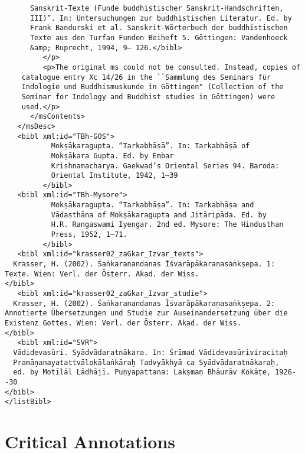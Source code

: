 \documentclass[article,12pt,a4paper]{memoir}
\begin{document}
\begin{verbatim}
      Sanskrit-Texte (Funde buddhistischer Sanskrit-Handschriften,
      III)”. In: Untersuchungen zur buddhistischen Literatur. Ed. by
      Frank Bandurski et al. Sanskrit-Wörterbuch der buddhistischen
      Texte aus den Turfan Funden Beiheft 5. Göttingen: Vandenhoeck
      &amp; Ruprecht, 1994, 9– 126.</bibl>
         </p>
         <p>The original ms could not be consulted. Instead, copies of
    catalogue entry Xc 14/26 in the ``Sammlung des Seminars für
    Indologie und Buddhismuskunde in Göttingen" (Collection of the
    Seminar for Indology and Buddhist studies in Göttingen) were
    used.</p>
      </msContents>
   </msDesc>
   <bibl xml:id="TBh-GOS">
	       Mokṣākaragupta. “Tarkabhāṣā”. In: Tarkabhāṣā of
	       Mokṣākara Gupta. Ed. by Embar
	       Krishnamacharya. Gaekwad’s Oriental Series 94. Baroda:
	       Oriental Institute, 1942, 1–39
	     </bibl>
   <bibl xml:id="TBh-Mysore">
	       Mokṣākaragupta. “Tarkabhāṣa”. In: Tarkabhāṣa and
	       Vādasthāna of Mokṣākaragupta and Jitāripāda. Ed. by
	       H.R. Rangaswami Iyengar. 2nd ed. Mysore: The Hindusthan
	       Press, 1952, 1–71.
	     </bibl>
   <bibl xml:id="krasser02_zaGkar_Izvar_texts">
  Krasser, H. (2002). Śaṅkaranandanas Īśvarāpākaraṇasaṅkṣepa. 1: Texte. Wien: Verl. der Österr. Akad. der Wiss.
</bibl>
   <bibl xml:id="krasser02_zaGkar_Izvar_studie">
  Krasser, H. (2002). Śaṅkaranandanas Īśvarāpākaraṇasaṅkṣepa. 2: Annotierte Übersetzungen und Studie zur Auseinandersetzung über die Existenz Gottes. Wien: Verl. der Österr. Akad. der Wiss.
</bibl>
   <bibl xml:id="SVR">
  Vādidevasūri. Syādvādaratnākara. In: Śrīmad Vādidevasūriviracitaḥ
  Pramāṇanayatattvālokālaṅkāraḥ Tadvyākhyā ca Syādvādaratnākaraḥ,
  ed. by Motīlāl Lādhājī. Puṇyapattana: Lakṣmaṇ Bhāurāv Kokāṭe, 1926--30
</bibl>
</listBibl>
       \end{verbatim}
     
\chapter[{Critical Annotations}]{Critical Annotations}                                      %
     
\end{document}
